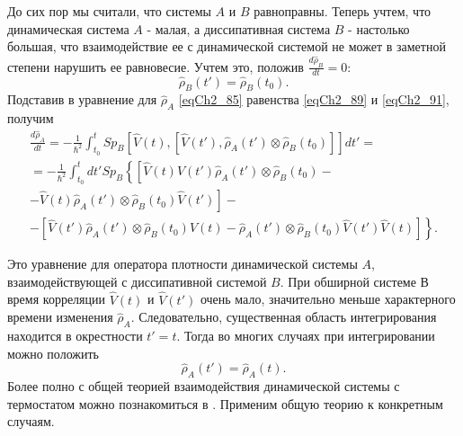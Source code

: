 До сих пор мы считали, что системы  $A$  и  $B$  равноправны. Теперь
учтем, что динамическая система  $A$ - малая, а диссипативная система
$B$ - настолько большая, что взаимодействие ее с динамической системой
не может в заметной степени нарушить ее равновесие. Учтем это, положив
$\frac{d \hat{\rho}_B}{d t} = 0$: 
\begin{equation}
\hat{\rho}_B\left(t'\right) =
\hat{\rho}_B\left(t_0\right).
\label{eqCh2_92}
\end{equation}
Подставив в уравнение для $\hat{\rho}_A$ \eqref{eqCh2_85} равенства
\eqref{eqCh2_89} и \eqref{eqCh2_91}, получим 
\begin{eqnarray}
\frac{d \hat{\rho}_A}{d t} = - \frac{1}{\hbar^2}
\int_{t_0}^t Sp_B\left[
\hat{V}\left(t\right),
\left[
\hat{V}\left(t'\right),
\hat{\rho}_A\left(t'\right) \otimes
\hat{\rho}_B\left(t_0\right)
\right]
\right]dt' = 
\nonumber \\ 
=
- \frac{1}{\hbar^2}
\int_{t_0}^t d t' Sp_B\left\{
\left[
\hat{V}\left(t\right)
\hat{V}\left(t'\right)
\hat{\rho}_A\left(t'\right) \otimes
\hat{\rho}_B\left(t_0\right) -
\right.
\right.
\nonumber \\
-
\left.
\left.
\hat{V}\left(t\right)
\hat{\rho}_A\left(t'\right) \otimes
\hat{\rho}_B\left(t_0\right)
\hat{V}\left(t'\right)
\right] - 
\right.
\nonumber \\
-
\left.
\left[
\hat{V}\left(t'\right)
\hat{\rho}_A\left(t'\right) \otimes
\hat{\rho}_B\left(t_0\right)
\hat{V}\left(t\right)
-
\hat{\rho}_A\left(t'\right) \otimes
\hat{\rho}_B\left(t_0\right)
\hat{V}\left(t'\right)\hat{V}\left(t\right) 
\right]
\right\}.
\label{eqCh2_93}
\end{eqnarray}

Это уравнение для оператора плотности динамической системы  $A$,
взаимодействующей с диссипативной системой $B$.  При обширной системе 
В  время корреляции $\hat{V}\left(t\right)$ и $\hat{V}\left(t'\right)$
очень мало, значительно меньше 
характерного времени изменения $\hat{\rho}_A$.  Следовательно,
существенная область интегрирования находится в окрестности $t' =
t$. Тогда во многих случаях при интегрировании можно положить
\[
\hat{\rho}_A\left(t'\right) =
\hat{\rho}_A\left(t\right).
\]
Более полно с общей теорией взаимодействия динамической системы с
термостатом можно познакомиться в \cite{bLaks1974}. Применим
общую теорию к конкретным случаям.  
 
